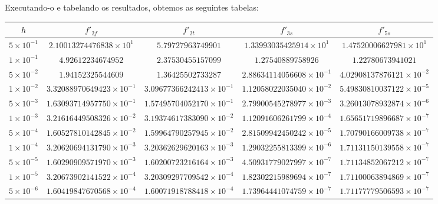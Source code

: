 \documentclass[12pt,a4paper]{article}
\begin{document}
Executando-o e tabelando os resultados, obtemos as seguintes tabelas:

\begin{table}[H]
\footnotesize
\centering
\begin{adjustwidth}{-2cm}{2cm}
\begin{tabular}{|c|c|c|c|c|}
\hline
$h$ & $f'_{2f}$ & $f'_{2t}$ & $f'_{3s}$ & $f'_{5s}$ \\ \hline
$5 \times 10^{-1}$ & $2.10013274476838 \times 10^{1}$ & $5.79727963749901$ & $1.33993035425914 \times 10^{1}$ & $1.47520006627981 \times 10^{1}$ \\ \hline
$1 \times 10^{-1}$ & $4.92612234674952$ & $2.37530455157099$ & $1.27540889758926$ & $1.22780673941021$ \\ \hline
$5 \times 10^{-2}$ & $1.94152325544609$ & $1.36425502733287$ & $2.88634114056608 \times 10^{-1}$ & $4.02908137876121 \times 10^{-2}$ \\ \hline
$1 \times 10^{-2}$ & $3.32088970649423 \times 10^{-1}$ & $3.09677366242413 \times 10^{-1}$ & $1.12058022035040 \times 10^{-2}$ & $5.49830810037122 \times 10^{-5}$ \\ \hline
$5 \times 10^{-3}$ & $1.63093714957750 \times 10^{-1}$ & $1.57495704052170 \times 10^{-1}$ & $2.79900545278977 \times 10^{-3}$ & $3.26013078932874 \times 10^{-6}$ \\ \hline
$1 \times 10^{-3}$ & $3.21616449508326 \times 10^{-2}$ & $3.19374617383090 \times 10^{-2}$ & $1.12091606261799 \times 10^{-4}$ & $1.65651719896687 \times 10^{-7}$ \\ \hline
$5 \times 10^{-4}$ & $1.60527810142845 \times 10^{-2}$ & $1.59964790257945 \times 10^{-2}$ & $2.81509942450242 \times 10^{-5}$ & $1.70790166009738 \times 10^{-7}$ \\ \hline
$1 \times 10^{-4}$ & $3.20620694131790 \times 10^{-3}$ & $3.20362629620163 \times 10^{-3}$ & $1.29032255813399 \times 10^{-6}$ & $1.71131150139558 \times 10^{-7}$ \\ \hline
$5 \times 10^{-5}$ & $1.60290909571970 \times 10^{-3}$ & $1.60200723216164 \times 10^{-3}$ & $4.50931779027997 \times 10^{-7}$ & $1.71134852067212 \times 10^{-7}$ \\ \hline
$1 \times 10^{-5}$ & $3.20673902141522 \times 10^{-4}$ & $3.20309297709542 \times 10^{-4}$ & $1.82302215989694 \times 10^{-7}$ & $1.71100063894869 \times 10^{-7}$ \\ \hline
$5 \times 10^{-6}$ & $1.60419847670568 \times 10^{-4}$ & $1.60071918788418 \times 10^{-4}$ & $1.73964441074759 \times 10^{-7}$ & $1.71177779506593 \times 10^{-7}$ \\ \hline

\end{tabular}
\end{adjustwidth}
\end{table}
\end{document}
